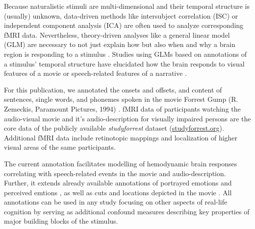 \documentclass[10pt,a4paper,onecolumn]{article}
\begin{document}
Because naturalistic stimuli are multi-dimensional and their temporal structure
is (usually) unknown, data-driven methods like intersubject correlation
(ISC)\citep{hasson2004intersubject} or independent component analysis
(ICA)\citep{bartels2004chronoarchitecture} are often used to analyze
corresponding fMRI data. Nevertheless, theory-driven analyses like a general
linear model (GLM) are necessary to not just explain how but also when and why a
brain region is responding to a stimulus \citep{hamilton2018revolution}. Studies
using GLMs based on annotations of a stimulus' temporal structure have
elucidated how the brain responds to visual features of a movie
\citep{bartels2004mapping} or speech-related features of a narrative
\citep{rocca2019language}.

For this publication, we annotated the onsets and offsets, and content of
sentences, single words, and phonemes spoken in the movie Forrest Gump (R.
Zemeckis, Paramount Pictures, 1994) \citep{ForrestGumpMovie}. fMRI data of
participants watching the audio-visual movie \citep{hanke2016simultaneous} and
it's audio-description for visually impaired persons \citep{hanke2014audiomovie}
are the core data of the publicly available \textit{studyforrest} dataset
(\href{www.studyforrest.org}{studyforrest.org}). Additional fMRI data
\citep{sengupta2016extension} include retinotopic mappings and localization of
higher visual areas of the same participants.

The current annotation facilitates modelling of hemodynamic brain responses
correlating with speech-related events in the movie and audio-description.
Further, it extends already available annotations of portrayed emotions
\citep{labs2015portrayed} and perceived emtions
\citep{lettieri2019emotionotopy}, as well as cuts and locations depicted in the movie \citep{haeusler2016annotation}. All annotations can be used in any study focusing on other aspects of real-life cognition by serving as additional
confound measures describing key properties of major building blocks of the stimulus.
\end{document}
